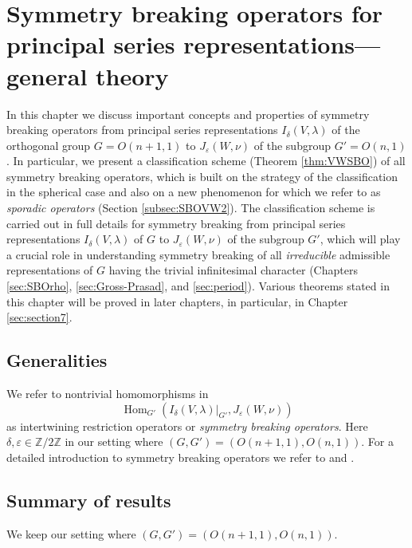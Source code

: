 \newpage
\section{Symmetry breaking operators 
 for principal series representations---general theory}
\label{sec:general}

In this chapter we discuss important concepts
 and properties of symmetry breaking operators from 
 principal series representations
 $I_{\delta}(V,\lambda)$ 
 of the orthogonal group $G=O(n+1,1)$
 to $J_{\varepsilon}(W,\nu)$ of the subgroup $G'=O(n,1)$.  
In particular,
 we present a classification scheme
 (Theorem \ref{thm:VWSBO})
 of all symmetry breaking operators,
 which is built on the strategy
 of the classification 
 in the spherical case
 \cite{sbon}
 and also on a new phenomenon 
 for which we refer to as {\it{sporadic operators}}
 (Section \ref{subsec:SBOVW2}).  
The classification scheme is carried out
 in full details
 for symmetry breaking from principal series representations
 $I_{\delta}(V,\lambda)$ of $G$
 to $J_{\varepsilon}(W,\nu)$ of the subgroup $G'$, 
 which will play a crucial role 
 in understanding symmetry breaking 
 of all {\it{irreducible}} admissible representations
 of $G$ 
 having the trivial infinitesimal character
 (Chapters \ref{sec:SBOrho}, \ref{sec:Gross-Prasad}, and \ref{sec:period}).  
Various theorems stated in this chapter 
 will be proved in later chapters,
 in particular,
 in Chapter \ref{sec:section7}.  



\subsection{Generalities}
\label{subsec:SBOgen}
We refer to nontrivial homomorphisms
 in 
\[
  {\operatorname{Hom}}_{G'}
  (I_{\delta}(V,\lambda)|_{G'}, J_{\varepsilon}(W,\nu))
\]
as intertwining restriction operators
 or 
{\it{symmetry breaking operators}}.  
Here $\delta, \varepsilon \in {\mathbb{Z}}/2 {\mathbb{Z}}$
 in our setting
 where $(G,G')=(O(n+1,1), O(n,1))$.  
For a detailed introduction to symmetry breaking operators
 we refer to \cite{xkvogan} and 
 \cite[Chaps.~1 and 3]{sbon}.  



\subsection{Summary of results}
\label{subsec:summarySBO}
We keep our setting
 where $(G,G')=(O(n+1,1), O(n,1))$.  



